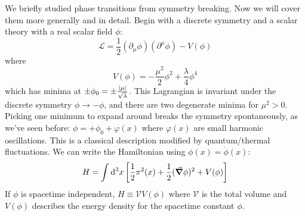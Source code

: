 \documentclass[a4paper,twoside,master.tex]{subfiles}
\begin{document}

We briefly studied phase transitions from symmetry breaking. Now we will cover them more generally and in detail. Begin with a discrete symmetry and a scalar theory with a real scalar field $ \phi $:
\begin{equation}
    \mathcal{L} = \frac{1}{2} (\partial_{\mu} \phi)(\partial^{\mu} \phi) - V(\phi)
\end{equation}
where
\begin{equation}
    V(\phi) = - \frac{\mu^2}{2} \phi^2 + \frac{\lambda}{4} \phi^4
\end{equation}
which has minima at $ \pm \phi_0 = \pm \frac{\abs{\mu}}{\sqrt{\lambda}} $. This Lagrangian is invariant under the discrete symmetry $ \phi \to - \phi $, and there are two degenerate minima for $ \mu^2 > 0 $. Picking one minimum to expand around breaks the symmetry spontaneously, as we've seen before: $ \phi = + \phi_0 + \varphi(x) $ where $ \varphi(x) $ are small harmonic oscillations. This is a classical description modified by quantum/thermal fluctuations. We can write the Hamiltonian using $ \phi(x) = \dot{\phi}(x) $:
\begin{equation}
    H = \int \dd[3]{x} \left[ \frac{1}{2} \pi^2(x) + \frac{1}{2} (\grad{\phi})^2 + V(\phi) \right]
\end{equation}
If $ \phi $ is spacetime independent, $ H \equiv \mathcal{V} V(\phi) $ where $ \mathcal{V} $ is the total volume and $ V(\phi) $ describes the energy density for the spacetime constant $ \phi $.
\end{document}

